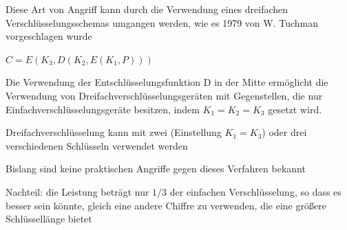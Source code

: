 \documentclass[a4paper]{article}
\begin{document}
\begin{multicols}{3}
\begin{itemize*}
            \item Diese Art von Angriff kann durch die Verwendung eines dreifachen Verschlüsselungsschemas umgangen werden, wie es 1979 von W. Tuchman vorgeschlagen wurde
            \begin{itemize*}
                  \item $C=E(K_3,D(K_2,E(K_1,P)))$
                  \item Die Verwendung der Entschlüsselungsfunktion D in der Mitte ermöglicht die Verwendung von Dreifachverschlüsselungsgeräten mit Gegenstellen, die nur Einfachverschlüsselungsgeräte besitzen, indem $K_1=K_2=K_3$ gesetzt wird.
                  \item Dreifachverschlüsselung kann mit zwei (Einstellung $K_1=K_3$) oder drei verschiedenen Schlüsseln verwendet werden
                  \item Bislang sind keine praktischen Angriffe gegen dieses Verfahren bekannt
                  \item Nachteil: die Leistung beträgt nur $1/3$ der einfachen Verschlüsselung, so dass es besser sein könnte, gleich eine andere Chiffre zu verwenden, die eine größere Schlüssellänge bietet
            \end{itemize*}
      \end{itemize*}


\end{multicols}
\end{document}
